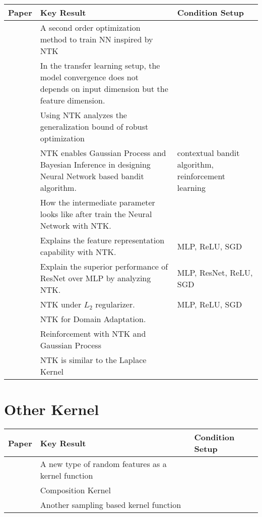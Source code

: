 \documentclass{article}
\begin{document}
\begin{table}[H]
\centering
\begin{tabular}{|p{}|p{}|p{}|}
\hline
Paper & Key Result & Condition Setup \\
\hline
\cite{Cai,Jacot2020b}        & A second order optimization method to train NN inspired by NTK &  \\
\hline
\cite{Damian}            & In the transfer learning setup, the model convergence does not depends on input dimension but the feature dimension.  &\\
\hline
\cite{Deng}            & Using NTK analyzes the generalization bound of robust optimization &\\
\hline
\cite{Lisicki,Zhou,Kassraie2022,Jia2022}        & NTK enables Gaussian Process and Bayesian Inference in designing Neural Network based bandit algorithm. & contextual bandit algorithm, reinforcement learning \\
\hline
\cite{Long}        & How the intermediate parameter looks like after train the Neural Network with NTK. &  \\
\hline
\cite{Lou}        & Explains the feature representation capability with NTK. & MLP, ReLU, SGD \\
\hline
\cite{Tirer}        & Explain the superior performance of ResNet over MLP by analyzing NTK. & MLP, ResNet, ReLU, SGD \\
\hline
\cite{Wei}        & NTK under $L_2$ regularizer. & MLP, ReLU, SGD \\
\hline
\cite{Wu}        & NTK for Domain Adaptation. & \\
\hline
\cite{Goumiri2020}        & Reinforcement with NTK and Gaussian Process & \\
\hline
\cite{Chen2021a,Geifman2020}        & NTK is similar to the Laplace Kernel &  \\
\hline
\end{tabular}
\end{table}

\section{Other Kernel}

\begin{table}[H]
\centering
\begin{tabular}{|p{}|p{}|p{}|}
\hline
Paper & Key Result & Condition Setup \\
\hline
\cite{Han}        & A new type of random features as a kernel function &  \\
\hline
\cite{Shankar}            & Composition Kernel  &\\
\hline
\cite{Woodruff}        & Another sampling based kernel function &  \\
\hline
\end{tabular}
\end{table}
\end{document}
